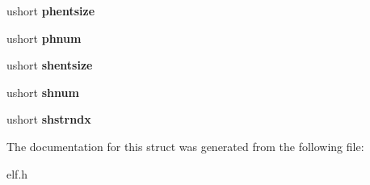 \begin{DoxyCompactItemize}
\item 
ushort {\bfseries phentsize}\hypertarget{structelfhdr_ac636a4a9c4c61933c6044275ed687bc9}{}\label{structelfhdr_ac636a4a9c4c61933c6044275ed687bc9}

\item 
ushort {\bfseries phnum}\hypertarget{structelfhdr_a3eff58d58a3ee83aa53d7ffdebdb6b5b}{}\label{structelfhdr_a3eff58d58a3ee83aa53d7ffdebdb6b5b}

\item 
ushort {\bfseries shentsize}\hypertarget{structelfhdr_aeedc5375e3f67e8dda6351e0e80b8e02}{}\label{structelfhdr_aeedc5375e3f67e8dda6351e0e80b8e02}

\item 
ushort {\bfseries shnum}\hypertarget{structelfhdr_aebf9526933b9f0502bdbafacce3734c1}{}\label{structelfhdr_aebf9526933b9f0502bdbafacce3734c1}

\item 
ushort {\bfseries shstrndx}\hypertarget{structelfhdr_a84f3d7712c99bfea3f4be42728dc0a0e}{}\label{structelfhdr_a84f3d7712c99bfea3f4be42728dc0a0e}

\end{DoxyCompactItemize}


The documentation for this struct was generated from the following file\+:\begin{DoxyCompactItemize}
\item 
elf.\+h\end{DoxyCompactItemize}
